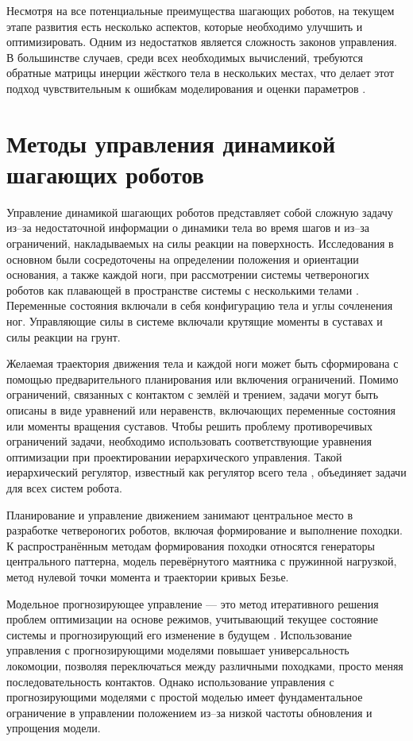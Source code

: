 Несмотря на все потенциальные преимущества шагающих роботов, на текущем этапе развития есть несколько аспектов, которые необходимо улучшить и оптимизировать. Одним из недостатков является сложность законов управления. В большинстве случаев, среди всех необходимых вычислений, требуются обратные матрицы инерции жёсткого тела в нескольких местах, что делает этот подход чувствительным к ошибкам моделирования и оценки параметров \cite{Nakanishi_IJRR_2008}. 

\section{Методы управления динамикой шагающих роботов }\label{sec:ch1/sec2}

Управление динамикой шагающих роботов представляет собой сложную задачу из--за недостаточной информации о динамики тела во время шагов и из--за ограничений, накладываемых на силы реакции на поверхность. Исследования в основном были сосредоточены на определении положения и ориентации основания, а также каждой ноги, при рассмотрении системы четвероногих роботов как плавающей в пространстве системы с несколькими телами \cite{Sergiu2010}. Переменные состояния включали в себя конфигурацию тела и углы сочленения ног. Управляющие силы в системе включали крутящие моменты в суставах и силы реакции на грунт.

Желаемая траектория движения тела и каждой ноги может быть сформирована с помощью предварительного планирования или включения ограничений. Помимо ограничений, связанных с контактом с землёй и трением, задачи могут быть описаны в виде уравнений или неравенств, включающих переменные состояния или моменты вращения суставов. Чтобы решить проблему противоречивых ограничений задачи, необходимо использовать соответствующие уравнения оптимизации при проектировании иерархического управления. Такой иерархический регулятор, известный как регулятор всего тела \cite{fahmi2019passive}, объединяет задачи для всех систем робота. 

Планирование и управление движением занимают центральное место в разработке четвероногих роботов, включая формирование и выполнение походки. К распространённым методам формирования походки относятся генераторы центрального паттерна, модель перевёрнутого маятника с пружинной нагрузкой, метод нулевой точки момента и траектории кривых Безье.

Модельное прогнозирующее управление --- это метод итеративного решения проблем оптимизации на основе режимов, учитывающий текущее состояние системы и прогнозирующий его изменение в будущем \cite{KIM2019}. Использование управления с прогнозирующими моделями повышает универсальность локомоции, позволяя переключаться между различными походками, просто меняя последовательность контактов. Однако использование управления с прогнозирующими моделями с простой моделью имеет фундаментальное ограничение в управлении положением из--за низкой частоты обновления и упрощения модели. 

